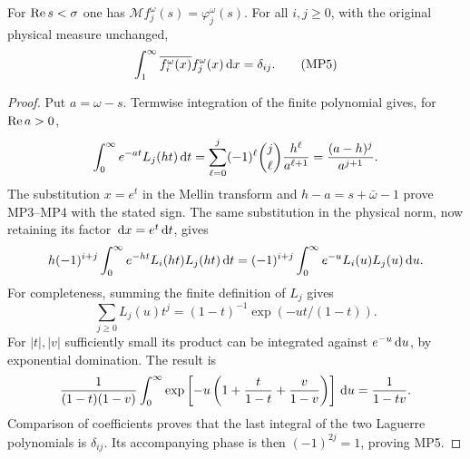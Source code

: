 \begin{swpolelemma}
For $\operatorname{Re} s<\sigma$ one has $\mathcal Mf_j^\omega(s)=\varphi_j^\omega(s)$.
For all $i,j\geq0$, with the original physical measure unchanged,
\begin{equation}
 \int_1^\infty\overline{f_i^\omega(x)}f_j^\omega(x)\,\mathrm d x=\delta_{ij}.
 \tag{MP5}
\end{equation}
\end{swpolelemma}
\begin{proof}
Put $a=\omega-s$. Termwise integration of the finite polynomial gives,
for $\operatorname{Re} a>0$,
\[
 \int_0^\infty e^{-at}L_j(ht)\,\mathrm d t
 =\sum_{\ell=0}^j(-1)^\ell\binom j\ell\frac{h^\ell}{a^{\ell+1}}
 =\frac{(a-h)^j}{a^{j+1}}.
\]
The substitution $x=e^t$ in the Mellin transform and
$h-a=s+\bar\omega-1$ prove MP3--MP4 with the stated sign.
The same substitution in the physical norm, now retaining its factor
$\,\mathrm d x=e^t\,\mathrm d t$, gives
\[
 h(-1)^{i+j}\int_0^\infty e^{-ht}L_i(ht)L_j(ht)\,\mathrm d t
 =(-1)^{i+j}\int_0^\infty e^{-u}L_i(u)L_j(u)\,\mathrm d u.
\]
For completeness, summing the finite definition of $L_j$ gives
\[
\sum_{j\geq0}L_j(u)t^j=(1-t)^{-1}\exp(-ut/(1-t)).
\]
For $|t|,|v|$ sufficiently small its product can be integrated against
$e^{-u}\,\mathrm d u$, by exponential domination. The result is
\[
 \frac1{(1-t)(1-v)}
 \int_0^\infty\exp\left[-u\left(1+\frac t{1-t}
                         +\frac v{1-v}\right)\right]\,\mathrm d u
 =\frac1{1-tv}.
\]
Comparison of coefficients proves that the last integral of the two
Laguerre polynomials is $\delta_{ij}$. Its accompanying phase is then
$(-1)^{2j}=1$, proving MP5.
\end{proof}

